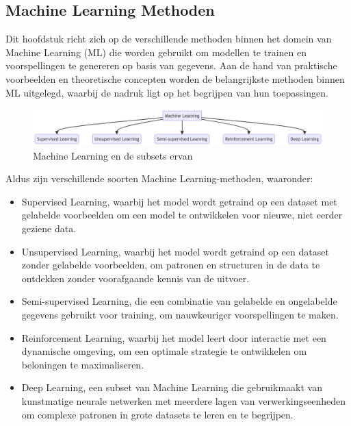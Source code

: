 \subsection{Machine Learning Methoden}

Dit hoofdstuk richt zich op de verschillende methoden binnen het domein van Machine Learning (ML) die worden gebruikt om modellen te trainen en voorspellingen te genereren op basis van gegevens. Aan de hand van praktische voorbeelden en theoretische concepten worden de belangrijkste methoden binnen ML uitgelegd, waarbij de nadruk ligt op het begrijpen van hun toepassingen.

\begin{figure}[h]
    \includegraphics[width=\linewidth]{graphics/mm.png}
    \caption{Machine Learning en de subsets ervan}
    \label{fig:ML_subsets}
\end{figure}

Aldus \textcite{Mahesh2019} zijn verschillende soorten Machine Learning-methoden, waaronder:

\begin{itemize}
    \item Supervised Learning, waarbij het model wordt getraind op een dataset met gelabelde voorbeelden om een model te ontwikkelen voor nieuwe, niet eerder geziene data.

    \item Unsupervised Learning, waarbij het model wordt getraind op een dataset zonder gelabelde voorbeelden, om patronen en structuren in de data te ontdekken zonder voorafgaande kennis van de uitvoer.

    \item Semi-supervised Learning, die een combinatie van gelabelde en ongelabelde gegevens gebruikt voor training, om nauwkeuriger voorspellingen te maken.

    \item Reinforcement Learning, waarbij het model leert door interactie met een dynamische omgeving, om een optimale strategie te ontwikkelen om beloningen te maximaliseren.

    \item Deep Learning, een subset van Machine Learning die gebruikmaakt van kunstmatige neurale netwerken met meerdere lagen van verwerkingseenheden om complexe patronen in grote datasets te leren en te begrijpen.
\end{itemize}


